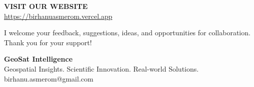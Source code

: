 \documentclass[a5paper,11pt]{article}
\begin{document}
\begin{minipage}{\dimexpr\paperwidth-1.7cm\relax}
\begin{center}
\colorbox{accent}{
  \parbox{0.88\linewidth}{
    \centering
    \vspace{3mm}
    {\large\bfseries\color{white} VISIT OUR WEBSITE}\\[2mm]
    {\normalsize\color{white}
    \url{https://birhanuasmerom.vercel.app}}\\
    \vspace{3mm}
  }
}
\end{center}

\vspace{2mm}

{\small\color{brandmuted}
I welcome your feedback, suggestions, ideas, and opportunities
for collaboration. Thank you for your support!
}

\end{minipage}

\vfill

\begin{center}
  {\Large\bfseries\color{branddark} GeoSat Intelligence}\\[2mm]

  {\small\color{brandmuted}
  Geospatial Insights. Scientific Innovation. Real-world Solutions.}\\[2mm]

  {\small\color{accent}
  birhanu.asmerom@gmail.com}
\end{center}

\vspace{0.45cm}
\end{document}
